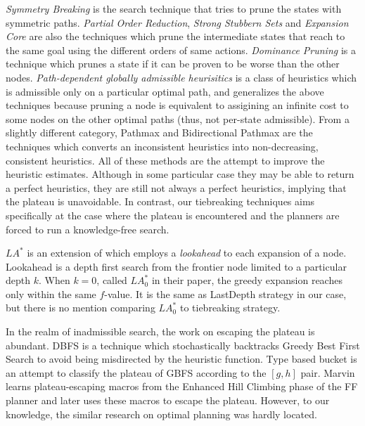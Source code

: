 \emph{Symmetry Breaking}
\cite{Fox1998,pochter2011exploiting,domshlak2013symmetry} is the search
technique that tries to prune the states with symmetric
paths. \emph{Partial Order Reduction}, \emph{Strong Stubbern Sets} and
\emph{Expansion Core} are also the techniques which prune the
intermediate states that reach to the same goal using the different
orders of same actions. \emph{Dominance Pruning} \cite{hall2013faster} is a
technique which prunes a state if it can be proven to be worse than the other nodes.
% 
\emph{Path-dependent globally admissible
heurisitics} \cite{karpas2012optimal} is a class of heuristics which is
admissible only on a particular optimal path, and generalizes the above
techniques because pruning a node is equivalent to assigining an
infinite cost to some nodes on the other optimal paths (thus, not
per-state admissible).
From a slightly different category, Pathmax \cite{mero1984heuristic} and
Bidirectional Pathmax \cite{felner2011inconsistent} are the techniques
which converts an inconsistent heuristics into non-decreasing,
consistent heuristics.
All of these methods are the
attempt to improve the heuristic estimates. Although in some particular
case they may be able to return a perfect heuristics, they are still not
always a perfect heuristics, implying that the plateau is unavoidable.
In contrast, our tiebreaking techniques aims specifically at the case
where the plateau is encountered and the planners are forced to run a
knowledge-free search.

$LA^*$ \cite{stern2010look} is an extension of \astar which employs a
\emph{lookahead} to each expansion of a node. Lookahead is a depth first
search from the frontier node limited to a particular depth $k$. When
$k=0$, called $LA^*_0$ in their paper, the greedy expansion reaches only within
the same $f$-value. It is the same as LastDepth strategy in our
case, but there is no mention comparing $LA^*_0$ to tiebreaking strategy.

In the realm of inadmissible search, the work on escaping the plateau is
abundant. DBFS \cite{imai2011novel} is a technique which stochastically
backtracks Greedy Best First Search to avoid being misdirected by the
heuristic function. Type based bucket \cite{xie14type} is an attempt to
classify the plateau of GBFS according to the $[g,h]$ pair.
Marvin \cite{Coles07} learns plateau-escaping macros from the Enhanced
Hill Climbing phase of the FF planner \cite{Hoffmann01} and later uses
these macros to escape the plateau.  However, to our knowledge, the
similar research on optimal planning was hardly located.

